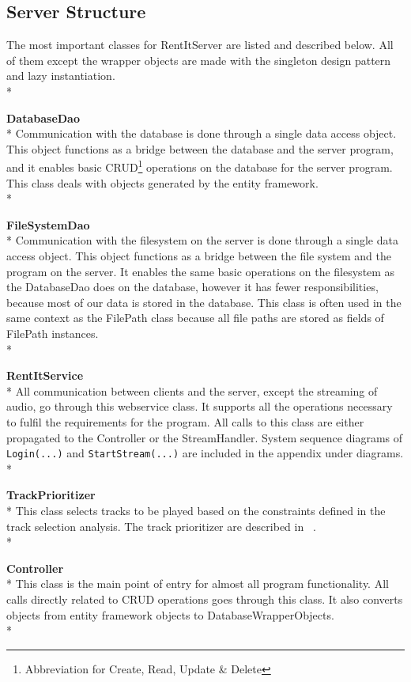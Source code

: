 \documentclass[a4paper,11pt,report]{article}
\begin{document}
{\subsection{Server Structure}
The most important classes for RentItServer are listed and described below. All of them except the wrapper objects are made with the singleton design pattern and lazy instantiation.\\*

\textbf{DatabaseDao} \\*
Communication with the database is done through a single data access object. This object functions as a bridge between the database and the server program, and it enables basic CRUD\footnote{Abbreviation for Create, Read, Update \& Delete} operations on the database for the server program. This class deals with objects generated by the entity framework. \\*

\textbf{FileSystemDao} \\*
Communication with the filesystem on the server is done through a single data access object. This object functions as a bridge between the file system and the program on the server. It enables the same basic operations on the filesystem as the DatabaseDao does on the database, however it has fewer responsibilities, because most of our data is stored in the database. This class is often used in the same context as the FilePath class because all file paths are stored as fields of FilePath instances. \\*

\textbf{RentItService} \\*
All communication between clients and the server, except the streaming of audio, go through this webservice class. It supports all the operations necessary to fulfil the requirements for the program. All calls to this class are either propagated to the Controller or the StreamHandler. System sequence diagrams of \texttt{Login(...)} and \texttt{StartStream(...)} are included in the appendix under diagrams. \\*

\textbf{TrackPrioritizer} \\*
This class selects tracks to be played based on the constraints defined in the track selection analysis. The track prioritizer are described in ~. \\*

\textbf{Controller} \\*
This class is the main point of entry for almost all program functionality. All calls directly related to CRUD operations goes through this class. It also converts objects from entity framework objects to DatabaseWrapperObjects.\\*

}
\end{document}
